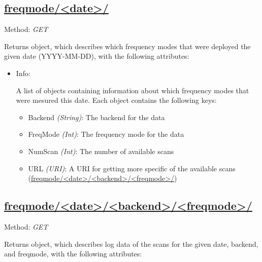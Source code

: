 \subsection{\url{freqmode/<date>/}}
Method: \emph{GET}

Returns object, which describes which frequency modes that were deployed the
given date (YYYY-MM-DD), with the following attributes:
\begin{itemize}
    \item Info:

        A list of objects containing information about which
        frequency modes that were mesured this date. 
        Each object contains the following keys:

        \begin{itemize}
            \item Backend \emph{(String)}: The backend for the data
            \item FreqMode \emph{(Int)}: The frequency mode for the data
            \item NumScan \emph{(Int)}: The number of available scans
            \item URL \emph{(URI)}: A URI 
                for getting more specific of the available scans\\ 
                 (\url{freqmode/<date>/<backend>/<freqmode>/})
        \end{itemize}
\end{itemize}

\subsection{\url{freqmode/<date>/<backend>/<freqmode>/}}
Method: \emph{GET}

Returns object, which describes log data of the scans  
for the given date, backend, and freqmode,
with the following attributes:

